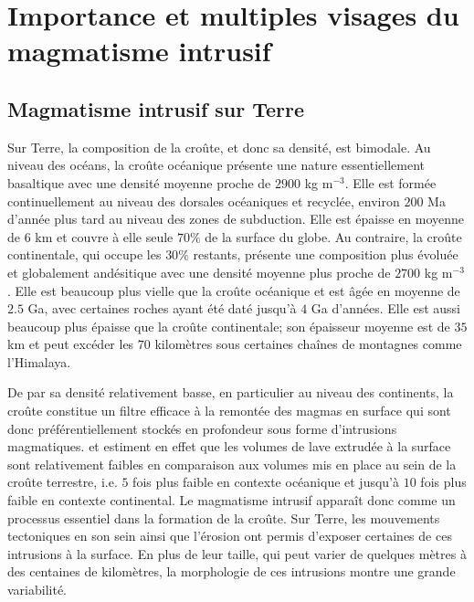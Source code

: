 \section{Importance et multiples visages du magmatisme intrusif}
\label{sec:zool-des-intr}

\subsection{Magmatisme intrusif sur Terre}
\label{sec:definition}

Sur  Terre, la  composition  de la  croûte, et  donc  sa densité,  est
bimodale.   Au niveau  des océans,  la croûte  océanique présente  une
nature essentiellement  basaltique avec une densité  moyenne proche de
$2900$ kg  m$^{-3}$.  Elle  est formée  continuellement au  niveau des
dorsales océaniques et recyclée, environ $200$ Ma d'année plus tard au
niveau des zones de subduction. Elle  est épaisse en moyenne de $6$ km
et couvre à elle seule $70\%$ de la surface du globe. Au contraire, la
croûte  continentale, qui  occupe  les $30\%$  restants, présente  une
composition plus  évoluée et globalement andésitique  avec une densité
moyenne plus  proche de  $2700$ kg m$^{-3}$.   Elle est  beaucoup plus
vielle que  la croûte océanique  et est âgée  en moyenne de  $2.5$ Ga,
avec certaines  roches ayant été  daté jusqu'à $4$ Ga  d'années.  Elle
est  aussi  beaucoup plus  épaisse  que  la croûte  continentale;  son
épaisseur moyenne est  de $35$ km et peut excéder  les $70$ kilomètres
sous certaines chaînes de montagnes comme l'Himalaya.

De par  sa densité  relativement basse, en  particulier au  niveau des
continents, la croûte  constitue un filtre efficace à  la remontée des
magmas  en  surface  qui   sont  donc  préférentiellement  stockés  en
profondeur sous forme  d'intrusions magmatiques.  \citet{Crisp:1984dm}
et  \citet{White:2006gr} estiment  en effet  que les  volumes de  lave
extrudée à  la surface  sont relativement  faibles en  comparaison aux
volumes mis  en place au sein  de la croûte terrestre,  i.e.  $5$ fois
plus faible en contexte océanique et  jusqu'à $10$ fois plus faible en
contexte continental.   Le magmatisme intrusif apparaît  donc comme un
processus essentiel  dans la formation  de la croûte.  Sur  Terre, les
mouvements  tectoniques en  son sein  ainsi que  l’érosion ont  permis
d'exposer certaines de  ces intrusions à la surface.  En  plus de leur
taille,  qui  peut  varier  de  quelques mètres  à  des  centaines  de
kilomètres,  la  morphologie  de  ces  intrusions  montre  une  grande
variabilité.


